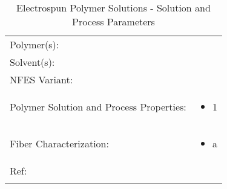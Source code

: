 \cite{Wang2017}    \\ %
\cite{Wang2018}    \\ %
\cite{Xu2014}      \\ %
\cite{Xue2014}     \\ %
\cite{Zheng2010}   \\ %
\cite{Zheng2014}   \\ %
\cite{Zheng2012}   \\ %

\begin{table}[th]
\caption{Electrospun Polymer Solutions - Solution and Process Parameters}
\begin{center}
\begin{tabular}{
>{\raggedright\arraybackslash}p{}
>{\raggedright\arraybackslash}p{} }

\hline
Polymer(s): &
 \\

\arrayrulecolor{lightgray}\hline
Solvent(s): &
 \\

\hline
NFES Variant: &
 \\

\hline
Polymer Solution and Process Properties: &
\begin{itemize}[leftmargin=*]
\item 1
\end{itemize} \\

\hline
Fiber Characterization: &
\begin{itemize}[leftmargin=*]
\item a
\end{itemize} \\

\hline
Ref: & \cite{Bisht2011} \\
\arrayrulecolor{black}\hline
\label{tbl:FloresCompare}
\end{tabular}
\end{center}
\end{table}






